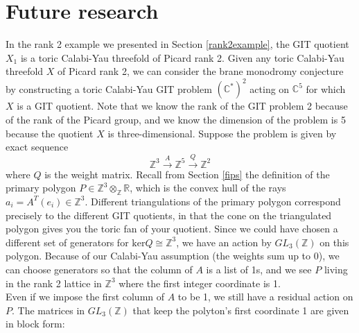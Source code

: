 \documentclass[oneside,reqno]{amsart}
\theoremstyle{definition}
\theoremstyle{definition}
\theoremstyle{definition}
\theoremstyle{definition}
\newcommand{\CC}{\mathbb{C}}
\newcommand{\Z}{\mathbb{Z}}
\newcommand{\R}{\mathbb{R}}
\begin{document}
\section{Future research}
\label{future}
In the rank 2 example we presented in Section \ref{rank2example}, the GIT quotient $X_1$ is a toric Calabi-Yau threefold of Picard rank 2. Given any toric Calabi-Yau threefold $X$ of Picard rank 2, we can consider the brane monodromy conjecture by constructing a toric Calabi-Yau GIT problem $(\CC^*)^2$ acting on $\CC^5$ for which $X$ is a GIT quotient. Note that we know the rank of the GIT problem 2 because of the rank of the Picard group, and we know the dimension of the problem is 5 because the quotient $X$ is three-dimensional. Suppose the problem is given by exact sequence
$$
\Z^3 \xrightarrow{A} \Z^5 \xrightarrow{Q} \Z^2
$$
where $Q$ is the weight matrix. Recall from Section \ref{fips} the definition of the primary polygon $P \in \Z^3 \otimes_{\Z} \R$, which is the convex hull of the rays $a_i = A^T(e_i) \in \Z^{3}$. Different triangulations of the primary polygon correspond precisely to the different GIT quotients, in that the cone on the triangulated polygon gives you the toric fan of your quotient. Since we could have chosen a different set of generators for $\text{ker}Q \cong \Z^3$, we have an action by $GL_3(\Z)$ on this polygon. Because of our Calabi-Yau assumption (the weights sum up to 0), we can choose generators so that the column of $A$ is a list of 1s, and we see $P$ living in the rank 2 lattice in $\Z^3$ where the first integer coordinate is 1. \\
\newline
Even if we impose the first column of $A$ to be 1, we still have a residual action on $P$. The matrices in $GL_3(\Z)$ that keep the polyton's first coordinate 1 are given in block form:
\end{document}
